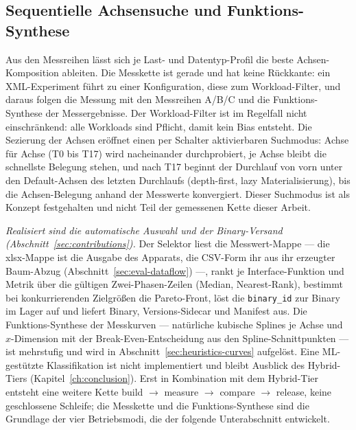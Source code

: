\begin{nurkurz}
\subsection{Sequentielle Achsensuche und Funktions-Synthese}\label{sec:heuristics-loop}
Aus den Messreihen lässt sich je Last- und Datentyp-Profil die beste
Achsen-Komposition ableiten.
Die Messkette ist gerade und hat keine Rückkante: ein XML-Experiment führt zu einer Konfiguration, diese zum
Workload-Filter, und daraus folgen die Messung mit den Messreihen A/B/C und die Funktions-Synthese der
Messergebnisse. Der Workload-Filter ist im Regelfall nicht einschränkend: alle Workloads sind Pflicht, damit
kein Bias entsteht. Die Sezierung der Achsen eröffnet einen per Schalter aktivierbaren Suchmodus: Achse für
Achse (T0 bis T17) wird nacheinander durchprobiert, je Achse bleibt die schnellste Belegung stehen, und nach
T17 beginnt der Durchlauf von vorn unter den Default-Achsen des letzten Durchlaufs (depth-first, lazy
Materialisierung), bis die Achsen-Belegung anhand der Messwerte konvergiert. Dieser Suchmodus ist als Konzept
festgehalten und nicht Teil der gemessenen Kette dieser Arbeit.

\emph{Realisiert sind die automatische Auswahl und der Binary-Versand (Abschnitt~\ref{sec:contributions}).}
Der Selektor liest die Messwert-Mappe --- die xlsx-Mappe
ist die Ausgabe des Apparats, die CSV-Form ihr aus ihr erzeugter Baum-Abzug (Abschnitt~\ref{sec:eval-dataflow})
---, rankt je Interface-Funktion und Metrik über die gültigen Zwei-Phasen-Zeilen (Median, Nearest-Rank),
bestimmt bei konkurrierenden Zielgrößen die Pareto-Front, löst die \texttt{binary\_id} zur Binary im Lager auf
und liefert Binary, Versions-Sidecar und Manifest aus.
Die Funktions-Synthese der Messkurven --- natürliche kubische Splines je Achse und $x$-Dimension mit der
Break-Even-Entscheidung aus den Spline-Schnittpunkten --- ist mehrstufig und wird in
Abschnitt~\ref{sec:heuristics-curves} aufgelöst. Eine ML-gestützte Klassifikation ist nicht implementiert und
bleibt Ausblick des Hybrid-Tiers (Kapitel~\ref{ch:conclusion}). Erst in Kombination mit dem Hybrid-Tier
entsteht eine weitere Kette build $\to$ measure $\to$ compare $\to$ release, keine geschlossene Schleife; die
Messkette und die Funktions-Synthese sind die Grundlage der vier Betriebsmodi, die der folgende Unterabschnitt
entwickelt.
\end{nurkurz}

